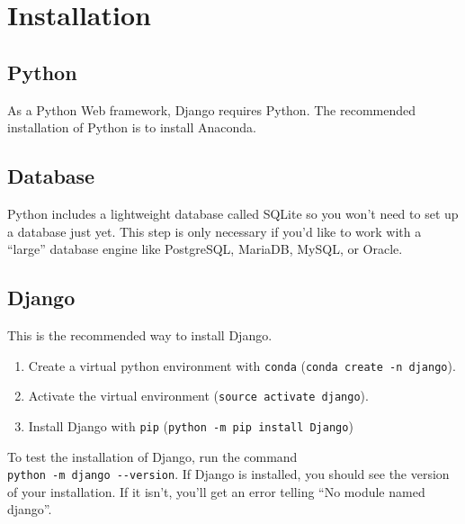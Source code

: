 
\chapter{Installation}

\section{Python}

As a Python Web framework, Django requires Python.
The recommended installation of Python is to install Anaconda.

\section{Database}

Python includes a lightweight database called SQLite so you won’t need to set up a database just yet.
This step is only necessary if you’d like to work with a “large” database engine like PostgreSQL, MariaDB, MySQL, or Oracle.

\section{Django}

This is the recommended way to install Django.

\begin{enumerate}
\item Create a virtual python environment with \verb|conda| (\verb|conda create -n django|).
\item Activate the virtual environment (\verb|source activate django|).
\item Install Django with \verb|pip| (\verb|python -m pip install Django|)
\end{enumerate}

To test the installation of Django, run the command \\
\verb|python -m django --version|.
If Django is installed, you should see the version of your installation.
If it isn’t, you’ll get an error telling “No module named django”.

